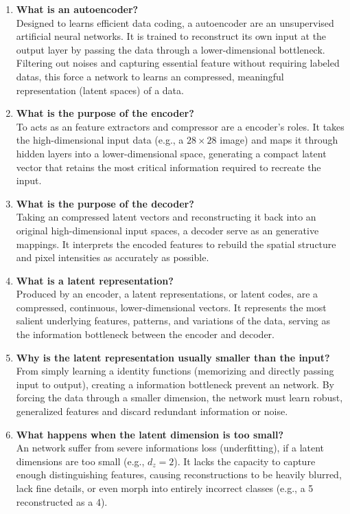 \documentclass[10pt]{article}
\begin{document}
\begin{enumerate}
\item \textbf{What is an autoencoder?}\\
Designed to learns efficient data coding, a autoencoder are an unsupervised artificial neural networks. It is trained to reconstruct its own input at the output layer by passing the data through a lower-dimensional bottleneck. Filtering out noises and capturing essential feature without requiring labeled datas, this force a network to learns an compressed, meaningful representation (latent spaces) of a data.

\item \textbf{What is the purpose of the encoder?}\\
To acts as an feature extractors and compressor are a encoder's roles. It takes the high-dimensional input data (e.g., a $28\times28$ image) and maps it through hidden layers into a lower-dimensional space, generating a compact latent vector that retains the most critical information required to recreate the input.

\item \textbf{What is the purpose of the decoder?}\\
Taking an compressed latent vectors and reconstructing it back into an original high-dimensional input spaces, a decoder serve as an generative mappings. It interprets the encoded features to rebuild the spatial structure and pixel intensities as accurately as possible.

\item \textbf{What is a latent representation?}\\
Produced by an encoder, a latent representations, or latent codes, are a compressed, continuous, lower-dimensional vectors. It represents the most salient underlying features, patterns, and variations of the data, serving as the information bottleneck between the encoder and decoder.

\item \textbf{Why is the latent representation usually smaller than the input?}\\
From simply learning a identity functions (memorizing and directly passing input to output), creating a information bottleneck prevent an network. By forcing the data through a smaller dimension, the network must learn robust, generalized features and discard redundant information or noise.

\item \textbf{What happens when the latent dimension is too small?}\\
An network suffer from severe informations loss (underfitting), if a latent dimensions are too small (e.g., $d_z=2$). It lacks the capacity to capture enough distinguishing features, causing reconstructions to be heavily blurred, lack fine details, or even morph into entirely incorrect classes (e.g., a 5 reconstructed as a 4).


\end{enumerate}
\end{document}
